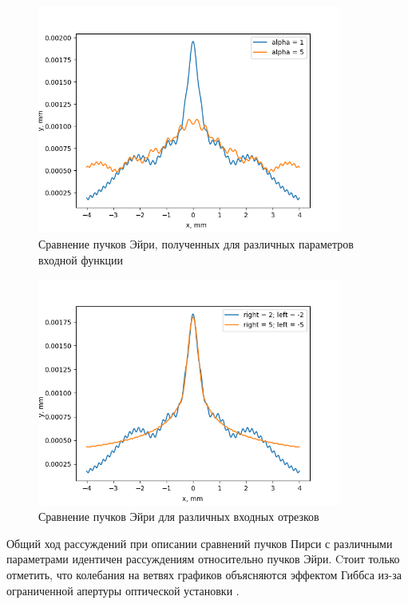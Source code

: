 { \begin{figure}[H]
		  \begin{center}
			\includegraphics[width=10cm]{plots/pe_param_comparison}
	\caption{Сравнение пучков Эйри, полученных для различных параметров входной функции}
	\label{pe_param_comparison}
		 \end{center}
\end{figure}

 \begin{figure}[H]
		  \begin{center}
			\includegraphics[width=10cm]{plots/pe_input_comparison}
	\caption{Сравнение пучков Эйри для различных входных отрезков}
	\label{pe_input_comparison}
		 \end{center}
\end{figure}

Общий ход рассуждений при описании сравнений пучков Пирси с различными параметрами идентичен рассуждениям относительно пучков Эйри. Cтоит только отметить, что колебания на ветвях графиков объясняются эффектом Гиббса  из-за ограниченной апертуры оптической установки \cite{gibbs}.

}

